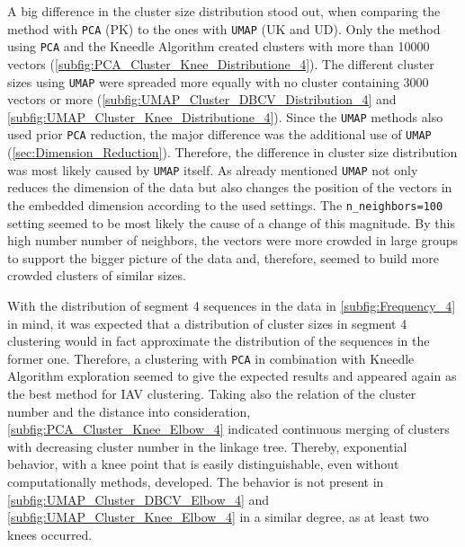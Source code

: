 \vspace{1em}

A big difference in the cluster size distribution stood out, when comparing the method with \texttt{PCA} (PK) to the ones with \texttt{UMAP} (UK and UD). Only the method using \texttt{PCA} and the Kneedle Algorithm created clusters with more than 10000 vectors (\autoref{subfig:PCA_Cluster_Knee_Distributione_4}). The different cluster sizes using \texttt{UMAP} were spreaded more equally with no cluster containing 3000 vectors or more (\autoref{subfig:UMAP_Cluster_DBCV_Distribution_4} and \autoref{subfig:UMAP_Cluster_Knee_Distributione_4}). Since the \texttt{UMAP} methods also used prior \texttt{PCA} reduction, the major difference was the additional use of \texttt{UMAP} (\autoref{sec:Dimension_Reduction}). Therefore, the difference in cluster size distribution was most likely caused by \texttt{UMAP} itself. As already mentioned \texttt{UMAP} not only reduces the dimension of the data but also changes the position of the vectors in the embedded dimension according to the used settings. The \texttt{n\_neighbors=100} setting seemed to be most likely the cause of a change of this magnitude. By this high number number of neighbors, the vectors were more crowded in large groups to support the bigger picture of the data and, therefore, seemed to build more crowded clusters of similar sizes. 

\vspace{1em}

With the distribution of segment 4 sequences in the data in \autoref{subfig:Frequency_4} in mind, it was expected that a distribution of cluster sizes in segment 4 clustering would in fact approximate the distribution of the sequences in the former one. Therefore, a clustering with \texttt{PCA} in combination with Kneedle Algorithm exploration seemed to give the expected results and appeared again as the best method for \gls{IAV} clustering. Taking also the relation of the cluster number and the distance into consideration, \autoref{subfig:PCA_Cluster_Knee_Elbow_4} indicated continuous merging of clusters with decreasing cluster number in the linkage tree. Thereby, exponential behavior, with a knee point that is easily distinguishable, even without computationally methods, developed. The behavior is not present in \autoref{subfig:UMAP_Cluster_DBCV_Elbow_4} and \autoref{subfig:UMAP_Cluster_Knee_Elbow_4} in a similar degree, as at least two knees occurred.  


